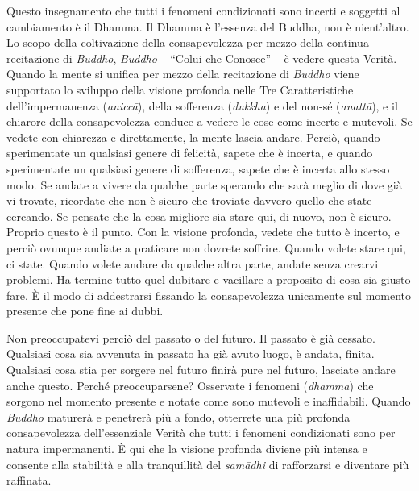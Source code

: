 Questo insegnamento che tutti i fenomeni condizionati sono incerti e
soggetti al cambiamento è il Dhamma. Il Dhamma è l'essenza del Buddha,
non è nient'altro. Lo scopo della coltivazione della consapevolezza per
mezzo della continua recitazione di \emph{Buddho}, \emph{Buddho} --
``Colui che Conosce'' -- è vedere questa Verità. Quando la mente si
unifica per mezzo della recitazione di \emph{Buddho} viene supportato lo
sviluppo della visione profonda nelle Tre Caratteristiche
dell'impermanenza (\emph{aniccā}), della sofferenza (\emph{dukkha}) e
del non-sé (\emph{anattā}), e il chiarore della consapevolezza conduce a
vedere le cose come incerte e mutevoli. Se vedete con chiarezza e
direttamente, la mente lascia andare. Perciò, quando sperimentate un
qualsiasi genere di felicità, sapete che è incerta, e quando
sperimentate un qualsiasi genere di sofferenza, sapete che è incerta
allo stesso modo. Se andate a vivere da qualche parte sperando che sarà
meglio di dove già vi trovate, ricordate che non è sicuro che troviate
davvero quello che state cercando. Se pensate che la cosa migliore sia
stare qui, di nuovo, non è sicuro. Proprio questo è il punto. Con la
visione profonda, vedete che tutto è incerto, e perciò ovunque andiate a
praticare non dovrete soffrire. Quando volete stare qui, ci state.
Quando volete andare da qualche altra parte, andate senza crearvi
problemi. Ha termine tutto quel dubitare e vacillare a proposito di cosa
sia giusto fare. È il modo di addestrarsi fissando la consapevolezza
unicamente sul momento presente che pone fine ai dubbi.

Non preoccupatevi perciò del passato o del futuro. Il passato è già
cessato. Qualsiasi cosa sia avvenuta in passato ha già avuto luogo, è
andata, finita. Qualsiasi cosa stia per sorgere nel futuro finirà pure
nel futuro, lasciate andare anche questo. Perché preoccuparsene?
Osservate i fenomeni (\emph{dhamma}) che sorgono nel momento presente e
notate come sono mutevoli e inaffidabili. Quando \emph{Buddho} maturerà
e penetrerà più a fondo, otterrete una più profonda consapevolezza
dell'essenziale Verità che tutti i fenomeni condizionati sono per natura
impermanenti. È qui che la visione profonda diviene più intensa e
consente alla stabilità e alla tranquillità del \emph{samādhi} di
rafforzarsi e diventare più raffinata.

